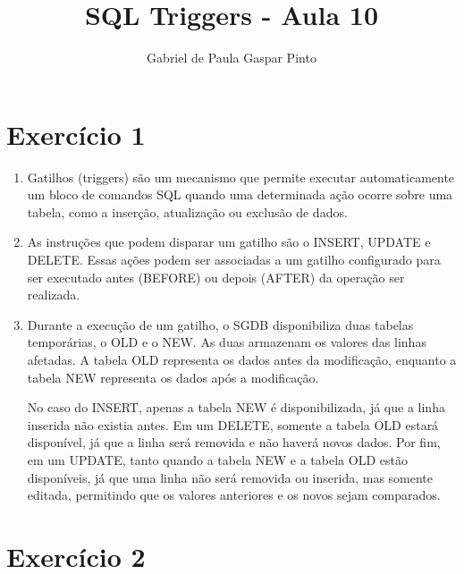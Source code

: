 \documentclass{article}
\title{SQL Triggers - Aula 10}
\author{Gabriel de Paula Gaspar Pinto}
\date{}
\begin{document}
\maketitle

\section*{Exercício 1}

\begin{enumerate}[label=\alph*)]

    \item Gatilhos (triggers) são um mecanismo que permite executar automaticamente um bloco de comandos SQL quando uma determinada ação ocorre sobre uma tabela, como a inserção, atualização ou exclusão de dados.
    
    \item As instruções que podem disparar um gatilho são o INSERT, UPDATE e DELETE. Essas ações podem ser associadas a um gatilho configurado para ser executado antes (BEFORE) ou depois (AFTER) da operação ser realizada.
    
    \item Durante a execução de um gatilho, o SGDB disponibiliza duas tabelas temporárias, o OLD e o NEW. As duas armazenam os valores das linhas afetadas. A tabela OLD representa os dados antes da modificação, enquanto a tabela NEW representa os dados após a modificação.
    \par No caso do INSERT, apenas a tabela NEW é disponibilizada, já que a linha inserida não existia antes. Em um DELETE, somente a tabela OLD estará disponível, já que a linha será removida e não haverá novos dados. Por fim, em um UPDATE, tanto quando a tabela NEW e a tabela OLD estão disponíveis, já que uma linha não será removida ou inserida, mas somente editada, permitindo que os valores anteriores e os novos sejam comparados.

\end{enumerate}

\section*{Exercício 2}
\end{document}
